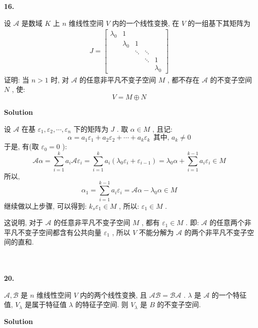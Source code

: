 \documentclass[11pt,a4paper,openany,oneside]{book}
\newcommand\Solution{\noindent\textbf{\textsf{Solution}}\par\medskip}
\begin{document}
\begin{myexample}
	\textbf{16.}

设 $ \mathcal{A} $ 是数域 $ K $ 上 $ n $ 维线性空间 $ V $ 内的一个线性变换, 在 $ V $ 的一组基下其矩阵为
\begin{gather*}
J =
\begin{bmatrix}
\lambda_0  &  1  &   &    &     \\
&  \lambda_0  &  1  &    &   \\
&         &   \ddots & \ddots &  \\
&      &        &  \ddots  &  1  \\
&    &        &          &   \lambda_0 
\end{bmatrix}
\end{gather*}
证明: 当 $ n>1 $ 时, 对 $ \mathcal{A} $ 的任意非平凡不变子空间 $ M $ , 都不存在 $ \mathcal{A} $ 的不变子空间 $ N $ , 使:
 $$  V = M \oplus  N  $$ 

\end{myexample}
\Solution  

设 $ \mathcal{A} $ 在基 $ \varepsilon_1, \varepsilon_2, \cdots, \varepsilon_n $ 下的矩阵为 $ J $ . 取 $ \alpha \in M $ , 且记:
 $$  \alpha = a_1\varepsilon_1 + a_2\varepsilon_2 + \cdots + a_k\varepsilon_k \ \ \text{其中, }a_k \neq 0  $$ 
于是, 有(取 $ \varepsilon_0 = 0 $ ):
 $$  \mathcal{A}\alpha = \sum\limits_{i=1}^k a_i \mathcal{A}\varepsilon_i = \sum\limits_{i=1}^k a_i(\lambda_0 \varepsilon_i + \varepsilon_{i-1}) = \lambda_0 \alpha + \sum\limits_{i=1}^{k-1}a_i\varepsilon_i \in M  $$ 
所以,
 $$  \alpha_1 = \sum\limits_{i=1}^{k-1} a_i\varepsilon_i = \mathcal{A}\alpha - \lambda_0 \alpha \in M   $$ 
继续做以上步骤, 可以得到:  $ k_s \varepsilon_1 \in M $ , 所以: $ \varepsilon_1 \in M $ .

这说明, 对于 $ \mathcal{A} $ 的任意非平凡不变子空间 $ M $ , 都有 $ \varepsilon_1 \in M $ . 即:  $ \mathcal{A} $ 的任意两个非平凡不变子空间都含有公共向量 $ \varepsilon_1 $ , 所以 $ V $ 不能分解为 $ \mathcal{A} $ 的两个非平凡不变子空间的直和.  \\  \\  \\


\begin{myexample}
	\textbf{20.}

 $ \mathcal{A}, \mathcal{B} $ 是 $ n $ 维线性空间 $ V $ 内的两个线性变换, 且 $ \mathcal{AB} = \mathcal{BA} $ . $ \lambda $ 是 $ \mathcal{A} $ 的一个特征值,  $ V_{\lambda} $ 是属于特征值 $ \lambda $ 的特征子空间. 则 $ V_{\lambda} $ 是 $ B $ 的不变子空间. \\

\end{myexample}
\Solution
\end{document}
